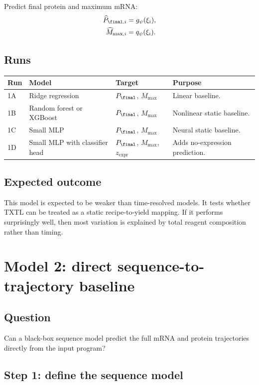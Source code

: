 \documentclass[11pt]{article}
\newcommand{\expr}{\mathrm{expr}}
\begin{document}
Predict final protein and maximum mRNA:
\begin{align}
    \widehat{P}_{\final,i} &= g_\psi(\xi_i), \\
    \widehat{M}_{\max,i} &= q_\psi(\xi_i).
\end{align}

\subsection{Runs}

\begin{center}
\begin{tabularx}{\textwidth}{lllX}
\toprule
Run & Model & Target & Purpose \\
\midrule
1A & Ridge regression & $P_{\final}$, $M_{\max}$ & Linear baseline. \\
1B & Random forest or XGBoost & $P_{\final}$, $M_{\max}$ & Nonlinear static baseline. \\
1C & Small MLP & $P_{\final}$, $M_{\max}$ & Neural static baseline. \\
1D & Small MLP with classifier head & $P_{\final}$, $M_{\max}$, $z_{\expr}$ & Adds no-expression prediction. \\
\bottomrule
\end{tabularx}
\end{center}

\subsection{Expected outcome}

This model is expected to be weaker than time-resolved models. It tests whether TXTL can be treated as a static recipe-to-yield mapping. If it performs surprisingly well, then most variation is explained by total reagent composition rather than timing.

\section{Model 2: direct sequence-to-trajectory baseline}

\subsection{Question}
Can a black-box sequence model predict the full mRNA and protein trajectories directly from the input program?

\subsection{Step 1: define the sequence model}
\end{document}
